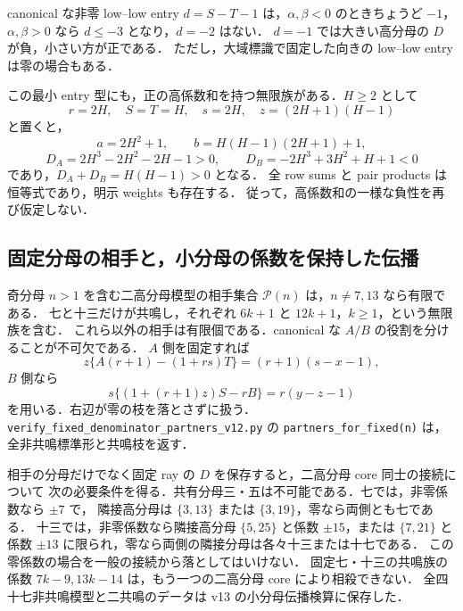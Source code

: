 canonical な非零 low--low entry $d=S-T-1$ は，$\alpha,\beta<0$ のときちょうど $-1$，
$\alpha,\beta>0$ なら $d\leq-3$ となり，$d=-2$ はない．
$d=-1$ では大きい高分母の $D$ が負，小さい方が正である．
ただし，大域標識で固定した向きの low--low entry は零の場合もある．

この最小 entry 型にも，正の高係数和を持つ無限族がある．$H\geq2$ として
\[
 r=2H,\quad S=T=H,\quad s=2H,\quad z=(2H+1)(H-1)
\]
と置くと，
\[
 a=2H^2+1,\qquad b=H(H-1)(2H+1)+1,
\]
\[
 D_A=2H^3-2H^2-2H-1>0,\qquad
 D_B=-2H^3+3H^2+H+1<0
\]
であり，$D_A+D_B=H(H-1)>0$ となる．
全 row sums と pair products は恒等式であり，明示 weights も存在する．
従って，高係数和の一様な負性を再び仮定しない．

\subsection{固定分母の相手と，小分母の係数を保持した伝播}

奇分母 $n>1$ を含む二高分母模型の相手集合 $\mathcal P(n)$ は，$n\ne7,13$ なら有限である．
七と十三だけが共鳴し，それぞれ $6k+1$ と $12k+1$，$k\geq1$，という無限族を含む．
これら以外の相手は有限個である．canonical な $A/B$ の役割を分けることが不可欠である．
$A$ 側を固定すれば
\[
 z\{A(r+1)-(1+rs)T\}=(r+1)(s-x-1),
\]
$B$ 側なら
\[
 s\{(1+(r+1)z)S-rB\}=r(y-z-1)
\]
を用いる．右辺が零の枝を落とさずに扱う．
\nolinkurl{verify_fixed_denominator_partners_v12.py} の
\texttt{partners\_for\_fixed(n)} は，全非共鳴標準形と共鳴枝を返す．

相手の分母だけでなく固定 ray の $D$ を保存すると，二高分母 core 同士の接続について
次の必要条件を得る．共有分母三・五は不可能である．七では，非零係数なら $\pm7$ で，
隣接高分母は $\{3,13\}$ または $\{3,19\}$，零なら両側とも七である．
十三では，非零係数なら隣接高分母 $\{5,25\}$ と係数 $\pm15$，または
$\{7,21\}$ と係数 $\pm13$ に限られ，零なら両側の隣接分母は各々十三または十七である．
この零係数の場合を一般の接続から落としてはいけない．
固定七・十三の共鳴族の係数 $7k-9,13k-14$ は，もう一つの二高分母 core により相殺できない．
全四十七非共鳴模型と二共鳴のデータは v13 の小分母伝播検算に保存した．






